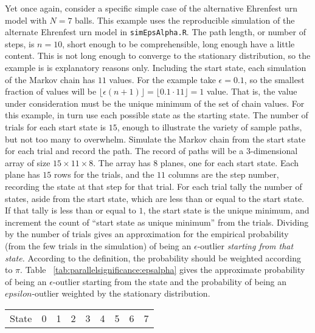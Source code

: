 \documentclass[12pt]{article}
\begin{document}
\begin{example}
    Yet once again, consider a specific simple case of the alternative
    Ehrenfest urn model with \( N = 7 \) balls.%
    This example uses the reproducible simulation of the alternate
    Ehrenfest urn model in \texttt{simEpsAlpha.R}. The path length, or
    number of steps, is \( n = 10 \), short enough to be comprehensible,
    long enough have a little content.  This is not long enough to
    converge to the stationary distribution, so the example is is
    explanatory reasons only.  Including the start state, each
    simulation of the Markov chain has \( 11 \) values. For the example
    take \( \epsilon = 0.1 \), so the smallest fraction of values will
    be \( \lfloor \epsilon (n+1) \rfloor = \lfloor 0.1 \cdot 11 \rfloor
    = 1 \) value.  That is, the value under consideration must be the
    unique minimum of the set of chain values. For this example, in turn use each
    possible state as the starting state. The number of trials for each
    start state is \( 15 \), enough to illustrate the variety of sample
    paths, but not too many to overwhelm. Simulate the Markov chain from
    the start state for each trial and record the path.  The record of
    paths will be a \( 3 \)-dimensional array of size \( 15 \times
    11 \times 8 \).  The array has \( 8 \) planes, one for each start
    state.  Each plane has \( 15 \) rows for the trials, and the \( 11 \)
    columns are the step number, recording the state at that step for
    that trial.  For each trial tally the number of states, aside from
    the start state, which are less than or equal to the start state.
    If that tally is less than or equal to \( 1 \), the start state is
    the unique minimum, and increment the count of ``start state as
    unique minimum'' from the trials. Dividing by the number of trials
    gives an approximation for the empirical probability (from the few
    trials in the simulation) of being an \( \epsilon \)-outlier \emph{starting
    from that state.} According to the definition, the probability
    should be weighted according to \( \pi \).  Table~%
    \ref{tab:parallelsignificance:epsalpha} gives the approximate
    probability of being an \( \epsilon \)-outlier
    starting from the state and the probability of being an
    \(epsilon \)-outlier weighted by the stationary distribution.
    \begin{table}
        \centering
        \begin{tabular}{l|cccccccc}
            State    & 0     & 1     & 2     & 3     & 4     & 5     & 6     & 7     \\ 

\end{tabular}
\end{table}
\end{example}
\end{document}

